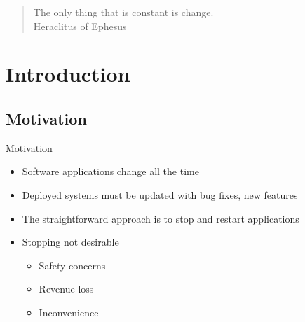 
{
\begin{frame}
\begin{block}{}
\begin{quote}
The only thing that is constant is change.\\
\hfill Heraclitus of Ephesus
\end{quote}
\end{block}
\end{frame}
}

\section{Introduction}
\subsection{Motivation}
\begin{frame}{Motivation}%
\begin{itemize}
\item Software applications change all the time
\item Deployed systems must be updated with bug fixes, new features
\item The straightforward approach is to stop and restart applications
\item Stopping not desirable
  \begin{itemize}
  \item Safety concerns
  \item Revenue loss
  \item Inconvenience
  \end{itemize}
\end{itemize}
\end{frame}

